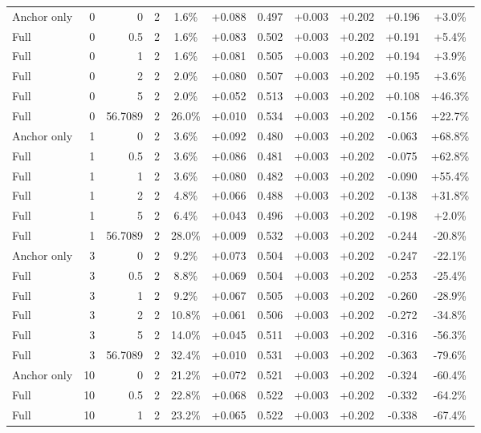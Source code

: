 \begin{table}[htbp]
\begin{tabular}{lrrrccccccc}
Anchor only & 0 & 0 & 2 & 1.6\% & +0.088 & 0.497 & +0.003 & +0.202 & +0.196 & +3.0\% \\
Full & 0 & 0.5 & 2 & 1.6\% & +0.083 & 0.502 & +0.003 & +0.202 & +0.191 & +5.4\% \\
Full & 0 & 1 & 2 & 1.6\% & +0.081 & 0.505 & +0.003 & +0.202 & +0.194 & +3.9\% \\
Full & 0 & 2 & 2 & 2.0\% & +0.080 & 0.507 & +0.003 & +0.202 & +0.195 & +3.6\% \\
Full & 0 & 5 & 2 & 2.0\% & +0.052 & 0.513 & +0.003 & +0.202 & +0.108 & +46.3\% \\
Full & 0 & 56.7089 & 2 & 26.0\% & +0.010 & 0.534 & +0.003 & +0.202 & -0.156 & +22.7\% \\
Anchor only & 1 & 0 & 2 & 3.6\% & +0.092 & 0.480 & +0.003 & +0.202 & -0.063 & +68.8\% \\
Full & 1 & 0.5 & 2 & 3.6\% & +0.086 & 0.481 & +0.003 & +0.202 & -0.075 & +62.8\% \\
Full & 1 & 1 & 2 & 3.6\% & +0.080 & 0.482 & +0.003 & +0.202 & -0.090 & +55.4\% \\
Full & 1 & 2 & 2 & 4.8\% & +0.066 & 0.488 & +0.003 & +0.202 & -0.138 & +31.8\% \\
Full & 1 & 5 & 2 & 6.4\% & +0.043 & 0.496 & +0.003 & +0.202 & -0.198 & +2.0\% \\
Full & 1 & 56.7089 & 2 & 28.0\% & +0.009 & 0.532 & +0.003 & +0.202 & -0.244 & -20.8\% \\
Anchor only & 3 & 0 & 2 & 9.2\% & +0.073 & 0.504 & +0.003 & +0.202 & -0.247 & -22.1\% \\
Full & 3 & 0.5 & 2 & 8.8\% & +0.069 & 0.504 & +0.003 & +0.202 & -0.253 & -25.4\% \\
Full & 3 & 1 & 2 & 9.2\% & +0.067 & 0.505 & +0.003 & +0.202 & -0.260 & -28.9\% \\
Full & 3 & 2 & 2 & 10.8\% & +0.061 & 0.506 & +0.003 & +0.202 & -0.272 & -34.8\% \\
Full & 3 & 5 & 2 & 14.0\% & +0.045 & 0.511 & +0.003 & +0.202 & -0.316 & -56.3\% \\
Full & 3 & 56.7089 & 2 & 32.4\% & +0.010 & 0.531 & +0.003 & +0.202 & -0.363 & -79.6\% \\
Anchor only & 10 & 0 & 2 & 21.2\% & +0.072 & 0.521 & +0.003 & +0.202 & -0.324 & -60.4\% \\
Full & 10 & 0.5 & 2 & 22.8\% & +0.068 & 0.522 & +0.003 & +0.202 & -0.332 & -64.2\% \\
Full & 10 & 1 & 2 & 23.2\% & +0.065 & 0.522 & +0.003 & +0.202 & -0.338 & -67.4\% \\

\end{tabular}
\end{table}
